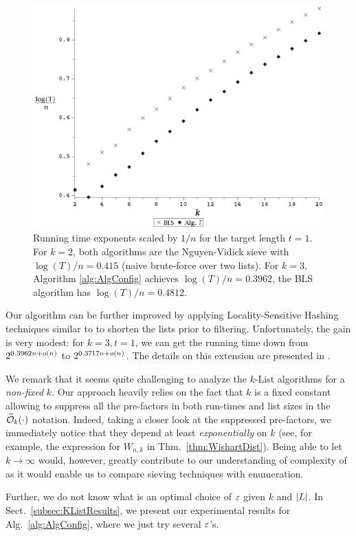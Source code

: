 \begin{figure}
	\centering
	\includegraphics[scale=0.2]{kListRunTimesCompare}
	\hspace{4ex}
	\caption[Runtime exponents for $k$-List algorithms]{Running time exponents scaled by $1/n$ for the target length $t=1$. For $k=2$, both algorithms are the Nguyen-Vidick sieve \cite{NguVid08} with $\log(T)/n = 0.415$ (naive brute-force over two lists). For $k=3$, Algorithm \ref{alg:AlgConfig} achieves $\log(T)/n = 0.3962$, the BLS algorithm has $\log(T)/n = 0.4812$. \vspace{10ex}} \label{fig:RunTimes}
\end{figure}

Our algorithm can be further improved by applying Locality-Sensitive Hashing techniques similar to \cite{SODA:BDGL16} to shorten the lists prior to filtering. Unfortunately, the gain is very modest: for $k=3, t=1$, we can get the running time down from $2^{0.3962n + o(n)}$ to $2^{0.3717n + o(n)}$. The details on this extension are presented in \cite{HK}.

We remark that it seems quite challenging to analyze the $k$-List algorithms for a \emph{non-fixed} $k$. Our approach heavily relies on the fact that $k$ is a fixed constant allowing to suppress all the pre-factors in both run-times and list sizes in the $\widetilde{\mathcal{O}}_k(\cdot)$ notation. Indeed, taking a closer look at the suppressed pre-factors, we immediately notice that they depend at least \emph{exponentially} on $k$ (see, for example, the expression for $W_{n,k}$ in Thm.~\ref{thm:WishartDist}). Being able to let $k \rightarrow \infty$ would, however, greatly contribute to our understanding of complexity of \SVP as it would enable us to compare sieving techniques with enumeration. 

Further, we do not know what is an optimal choice of $\varepsilon$ given $k$ and $|L|$. In Sect.~\ref{subsec:KListResults}, we present our experimental results for Alg.~\ref{alg:AlgConfig}, where we just try several $\varepsilon$'s.